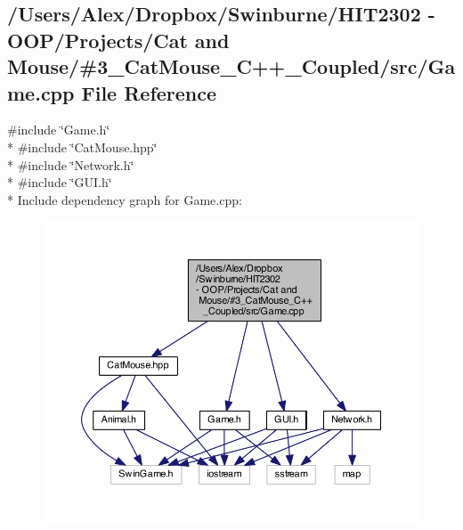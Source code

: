 \subsection{/\-Users/\-Alex/\-Dropbox/\-Swinburne/\-H\-I\-T2302 -\/ O\-O\-P/\-Projects/\-Cat and Mouse/\#3\-\_\-\-Cat\-Mouse\-\_\-\-C++\-\_\-\-Coupled/src/\-Game.cpp File Reference}
\label{_game_8cpp}
{\ttfamily \#include \char`\"{}Game.\-h\char`\"{}}\\*
{\ttfamily \#include \char`\"{}Cat\-Mouse.\-hpp\char`\"{}}\\*
{\ttfamily \#include \char`\"{}Network.\-h\char`\"{}}\\*
{\ttfamily \#include \char`\"{}G\-U\-I.\-h\char`\"{}}\\*
Include dependency graph for Game.\-cpp\-:
\nopagebreak
\begin{figure}[H]
\begin{center}
\leavevmode
\includegraphics[width=350pt]{_game_8cpp__incl}
\end{center}
\end{figure}
